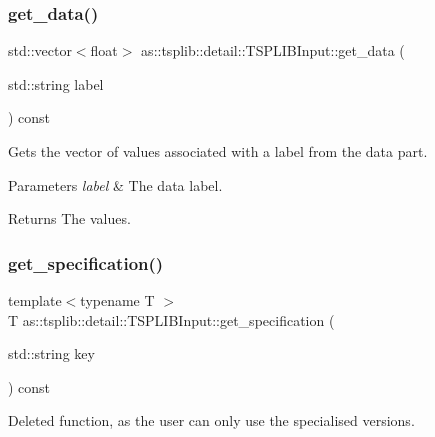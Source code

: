 \subsubsection{\texorpdfstring{get\+\_\+data()}{get\_data()}}
{\footnotesize\ttfamily std\+::vector$<$float$>$ as\+::tsplib\+::detail\+::\+T\+S\+P\+L\+I\+B\+Input\+::get\+\_\+data (\begin{DoxyParamCaption}\item[{std\+::string}]{label }\end{DoxyParamCaption}) const\hspace{0.3cm}{\ttfamily [inline]}}



Gets the vector of values associated with a label from the data part. 


\begin{DoxyParams}{Parameters}
{\em label} & The data label. \\
\hline
\end{DoxyParams}
\begin{DoxyReturn}{Returns}
The values. 
\end{DoxyReturn}
\mbox{\label{classas_1_1tsplib_1_1detail_1_1TSPLIBInput_a4af00dba4b765706aedb4bc8d90ba1dd}} 
\subsubsection{\texorpdfstring{get\+\_\+specification()}{get\_specification()}\hspace{0.1cm}{\footnotesize\ttfamily [1/4]}}
{\footnotesize\ttfamily template$<$typename T $>$ \\
T as\+::tsplib\+::detail\+::\+T\+S\+P\+L\+I\+B\+Input\+::get\+\_\+specification (\begin{DoxyParamCaption}\item[{std\+::string}]{key }\end{DoxyParamCaption}) const\hspace{0.3cm}{\ttfamily [delete]}}



Deleted function, as the user can only use the specialised versions. 

